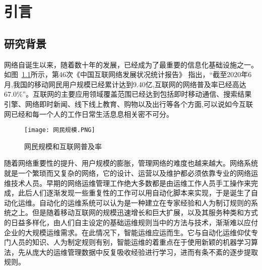 
\chapter{引言}


\section{研究背景}

网络自诞生以来，随着数十年的发展，已经成为了最重要的信息化基础设施之一。如图~\ref{fig:网民规模和互联网普及率}所示，第46次《中国互联网络发展状况统计报告》\cite{cac.gov} 指出，“截至2020年6月,我国的移动网民用户规模已经累计达到9.40亿,互联网的网络普及率已经高达67.0\%”。互联网的主要应用领域覆盖范围已经达到包括即时移动通信、搜索结果引擎、网络即时新闻、线下线上教育、购物以及出行等各个方面,可以说如今互联网已经和每一个人的工作日常生活息息相关密不可分。



\begin{figure}
    \centering
    \texttt{[image: 网民规模.PNG]}
    \caption{网民规模和互联网普及率}
    \label{fig:网民规模和互联网普及率}
  \end{figure}

随着网络重要性的提升、用户规模的膨胀，管理网络的难度也越来越大。网络系统就是一个繁琐而又复杂的网络，它的设计、运营以及维护都必须依靠专业的网络运维技术人员。早期的网络运维管理工作绝大多数都是由运维工作人员手工操作来完成，此后人们逐渐发现一些重复性的工作可以用自动化脚本来实现，于是诞生了自动化运维。自动化的运维系统可以认为是一种建立在专家经验和人为制订规则的系统之上。但是随着移动互联网的规模迅速增长和巨大扩展，以及其服务种类和方式的日益多样化，由人们自主设定的基础运维规则当中的方法与技术，渐渐难以应付企业的大规模运维需求。在此情况下，智能运维应运而生。它与自动化运维仰仗专门人员的知识、人为制定规则有别，智能运维的着重点在于使用新颖的机器学习算法，先从庞大的运维管理数据中反复吸收经验进行学习，进而有条不紊的逐步提取规则。


